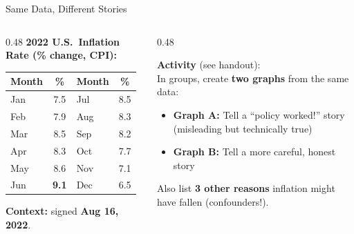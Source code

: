 \documentclass[9pt,english,aspectratio=169]{beamer}
\begin{document}
\begin{frame}{Same Data, Different Stories}

  \begin{columns}[T]
    \begin{column}{0.48\textwidth}
      {\small\textbf{2022 U.S.\ Inflation Rate (\% change, CPI):}}

      \vspace{0.3em}
      \centering
      {\small
      \begin{tabular}{l c l c}
        \toprule
        \textbf{Month} & \textbf{\%} & \textbf{Month} & \textbf{\%} \\
        \midrule
        Jan & 7.5 & Jul & 8.5 \\
        Feb & 7.9 & Aug & 8.3 \\
        Mar & 8.5 & Sep & 8.2 \\
        Apr & 8.3 & Oct & 7.7 \\
        May & 8.6 & Nov & 7.1 \\
        Jun & \textbf{9.1} & Dec & 6.5 \\
        \bottomrule
      \end{tabular}
      }

      \vspace{0.3em}
      {\small\textbf{Context:}  signed \textbf{Aug 16, 2022}.}
    \end{column}
    \begin{column}{0.48\textwidth}
      \begin{methodbox}
        \textbf{Activity} (see handout):\\[0.3em]
        In groups, create \textbf{two graphs} from the same data:
        \begin{itemize}
          \item \textbf{Graph A:} Tell a ``policy worked!'' story (misleading but technically true)
          \item \textbf{Graph B:} Tell a more careful, honest story
        \end{itemize}

        \vspace{0.3em}
        Also list \textbf{3 other reasons} inflation might have fallen (confounders!).
      \end{methodbox}

    \end{column}
  \end{columns}

\end{frame}
\end{document}
